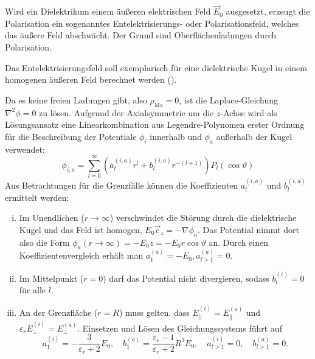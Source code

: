 Wird ein Dielektrikum einem äußeren elektrischen Feld $\vec {E}_{0}$ ausgesetzt, erzeugt die Polarisation ein sogenanntes Entelektrisierungs- oder Polarisationsfeld, welches das äußere Feld abschwächt. Der Grund sind Oberflächenladungen durch Polarisation.

Das Entelektrisierungsfeld soll exemplarisch für eine dielektrische Kugel in einem homogenen äußeren Feld berechnet werden ().

Da es keine freien Ladungen gibt, also $\rho _{\mathrm{Ma}}=0$, ist die Laplace-Gleichung $\nabla ^{2}\phi =0$ zu lösen. Aufgrund der Axialsymmetrie um die $z$-Achse wird als Lösungsansatz eine Linearkombination aus Legendre-Polynomen erster Ordnung für die Beschreibung der Potentiale $\phi _{i}$ innerhalb und $\phi _{a}$ außerhalb der Kugel verwendet:
\begin{equation*}
	\phi _{i,a}=\sum _{l=0}^{\infty }\left(a_{l}^{\left(i,a\right)}r^{l}+b_{l}^{\left(i,a\right)}r^{-\left(l+1\right)}\right)P_{l}\left(\cos \vartheta \right)
\end{equation*}
Aus Betrachtungen für die Grenzfälle können die Koeffizienten $a_{l}^{\left(i,a\right)}$ und $b_{l}^{\left(i,a\right)}$ ermittelt werden:

\begin{enumerate}[i)]
	\item Im Unendlichen ($r\rightarrow \infty $) verschwindet die Störung durch die dielektrische Kugel und das Feld ist homogen, $E_{0}\vec {e}_{z}=-\nabla \phi _{a}$. Das Potential nimmt dort also die Form $\phi _{a}\left(r\rightarrow \infty \right)=-E_{0}z=-E_{0}r\cos \vartheta $ an. Durch einen Koeffizientenvergleich erhält man $a_{1}^{\left(a\right)}=-E_{0}, a_{l>1}^{\left(a\right)}=0$.

	\item Im Mittelpunkt ($r=0$) darf das Potential nicht divergieren, sodass $b_{l}^{\left(i\right)}=0$ für alle $l$.

	\item An der Grenzfläche ($r=R$) muss gelten, dass $E_{\parallel }^{\left(i\right)}=E_{\parallel }^{\left(a\right)}$ und $\varepsilon _{r}E_{\perp }^{\left(i\right)}=E_{\perp }^{\left(a\right)}$. Einsetzen und Lösen des Gleichungssystems führt auf
	      \begin{equation*}
		      a_{1}^{\left(i\right)}=-\frac{3}{\varepsilon _{r}+2}E_{0},\quad b_{1}^{\left(a\right)}=\frac{\varepsilon _{r}-1}{\varepsilon _{r}+2}R^{3}E_{0},\quad a_{l>1}^{\left(i\right)}=0,\quad b_{l>1}^{\left(a\right)}=0.
	      \end{equation*}
\end{enumerate}


